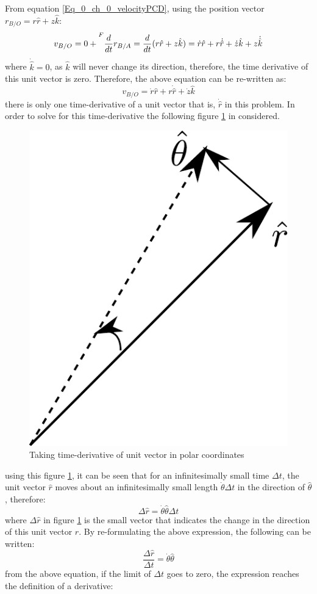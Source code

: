 From equation \eqref{Eq_0_ch_0_velocityPCD}, using the position vector $r_{B/O} = r \hat{r} + z \hat{k}$:
\begin{equation}
	v_{B/O} = 0 + \prescript{F}{}{\frac{d}{dt}r_{B/A}} = \frac{d}{dt}(r \hat{r} + z \hat{k}) = \dot{r}\hat{r} + r \dot{\hat{r}} + \dot{z}\hat{k} + z \dot{\hat{k}}
\end{equation}
where $\dot{\hat{k}} = 0$, as $\hat{k}$ will never change its direction, therefore, the time derivative of this unit vector is zero. Therefore, the above equation can be re-written as:
\begin{equation}
	v_{B/O} = \dot{r}\hat{r} + r \dot{\hat{r}} + \dot{z}\hat{k}
\end{equation}
there is only one time-derivative of a unit vector that is, $\dot{\hat{r}}$ in this problem. In order to solve for this time-derivative the following figure \ref{fig_0_ch_0_timeDerivativeUnitVector} in considered.
\newpage
\begin{figure}[h!]
	\centering
	\includegraphics[width=0.25\linewidth]{Bilder/07_UnitVector_Derivative_polar_coordinates.pdf}
	\caption{Taking time-derivative of unit vector in polar coordinates}
	\label{fig_0_ch_0_timeDerivativeUnitVector}
\end{figure}
using this figure \ref{fig_0_ch_0_timeDerivativeUnitVector}, it can be seen that for an infinitesimally small time $\Delta t$, the unit vector $\hat{r}$ moves about an  infinitesimally small length $\dot{\theta}\Delta t$ in the direction of $\hat{\theta}$, therefore:
\begin{equation}
	\Delta \hat{r} = \dot{\theta} \hat{\theta} \Delta t
\end{equation}
where $\Delta \hat{r}$ in figure \ref{fig_0_ch_0_timeDerivativeUnitVector} is the small vector that indicates the change in the direction of this unit vector $\hat{r}$. By re-formulating the above expression, the following can be written:
\begin{equation}
	\frac{\Delta \hat{r}}{\Delta t} = \dot{\theta} \hat{\theta}
\end{equation}
from the above equation, if the limit of $\Delta t$ goes to zero, the expression reaches the definition of a derivative:
